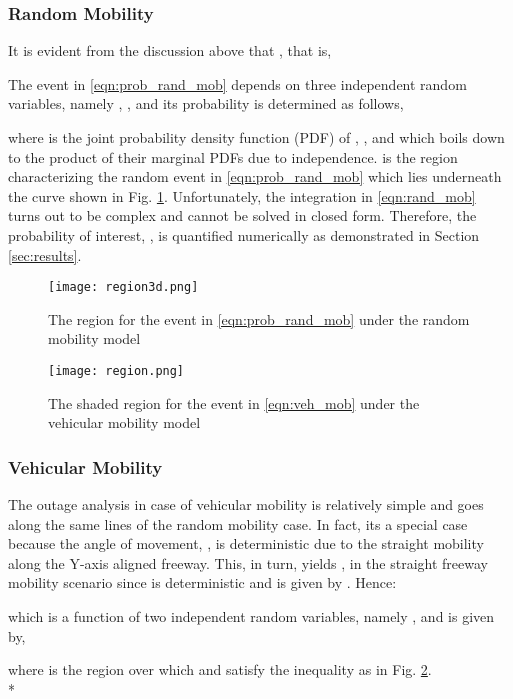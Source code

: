 \documentclass[conference,a4paper]{IEEEtran}
\begin{document}
\subsubsection{Random Mobility}
It is evident from the discussion above that , that is,


The event in \eqref{eqn:prob_rand_mob} depends on three independent random variables, namely , ,  and its probability is determined as follows,

\noindent where  is the joint probability density function (PDF) of , , and  which boils down to the product of their marginal PDFs due to independence.  is the region characterizing the random event in \eqref{eqn:prob_rand_mob} which lies underneath the curve shown in Fig. \ref{Flo:region3d}. Unfortunately, the integration in \eqref{eqn:rand_mob} turns out to be complex and cannot be solved in closed form. Therefore, the probability of interest, , is quantified numerically as demonstrated in Section \ref{sec:results}.
\begin{figure}[!t]
\centering
\texttt{[image: region3d.png]}
\setlength{\abovecaptionskip}{0pt}
\setlength{\belowcaptionskip}{-10pt}
\caption{The region  for the event in \eqref{eqn:prob_rand_mob} under the random mobility model}
\label{Flo:region3d}
\end{figure}
\begin{figure}[!t]
\centering
\texttt{[image: region.png]}
\setlength{\abovecaptionskip}{5pt}
\setlength{\belowcaptionskip}{-20pt}
\caption{The shaded region  for the event in \eqref{eqn:veh_mob} under the vehicular mobility model}
\label{Flo:region}
\end{figure}


\subsubsection{Vehicular Mobility}
The outage analysis in case of vehicular mobility is relatively simple and goes along the same lines of the random mobility case. In fact, its a special case because the angle of movement, , is deterministic due to the straight mobility along the Y-axis aligned freeway. This, in turn, yields , in the straight freeway mobility scenario since  is deterministic and is given by . Hence:

which is a function of two independent random variables, namely ,  and is given by,

\noindent where  is the region over which  and  satisfy the inequality  as in Fig. \ref{Flo:region}.\\*
\end{document}
